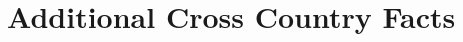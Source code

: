 \documentclass[12pt,notitlepage]{article}
\begin{document}




\clearpage
\appendix


\FloatBarrier
\section{Additional Cross Country Facts} %
\label{sec:additional_cross_country_facts}
\FloatBarrier
\end{document}
